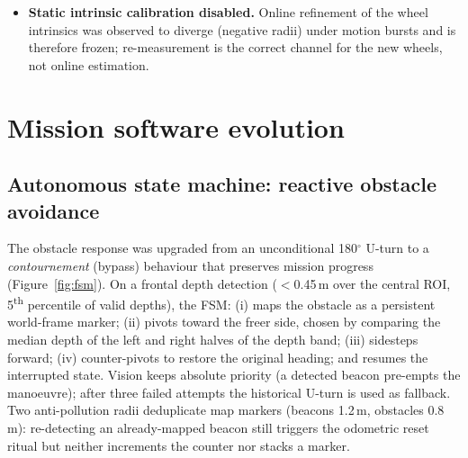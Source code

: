 \begin{itemize}
        modes. The correction is applied at the single command egress point
        (: a named  constant), so
        every drive path (manual, patrol, approach, pivot, return-to-base)
        inherits it consistently. A heading-projected odometry test
        ($-0.186$\,m reported along the firmware heading for a $+0.18$\,m
        commanded forward pulse) further indicates the firmware's body-frame
        \emph{forward} is now rotated 180$^\circ$ from the camera axis;
        after physical confirmation (the rover moves camera-forward on a
        positive command), both frame-level compensations were applied and
        validated: the mission backend rotates the firmware heading by
        $\pi$ at its single odometry ingress (map, return-to-base and world
        bearings all reason in the camera frame), and MINS's wheel extrinsic
        seed was set to $R_z(\pi)$, reconciling the wheel model with the
        inertial/camera frame. Post-fix validation: a forward pulse reads
        $+0.200$\,m along the camera heading (expected $+0.18$), and MINS
        accepts 100\% of wheel measurements ($\chi^2$ gate, residuals
        $\sim5\times10^{-6}$): ending a period during which the flipped
        frame caused silent wheel rejection and the loss of planar anchoring.
  \item \textbf{Static intrinsic calibration disabled.} Online refinement of
        the wheel intrinsics was observed to diverge (negative radii) under
        motion bursts and is therefore frozen; re-measurement is the correct
        channel for the new wheels, not online estimation.
\end{itemize}

\section{Mission software evolution}
\label{sec:missionsw}

\subsection{Autonomous state machine: reactive obstacle avoidance}
The obstacle response was upgraded from an unconditional 180$^\circ$ U-turn
to a \emph{contournement} (bypass) behaviour that preserves mission
progress (Figure~\ref{fig:fsm}). On a frontal depth detection
($<$0.45\,m over the central ROI, 5\textsuperscript{th} percentile of valid
depths), the FSM: (i) maps the obstacle as a persistent world-frame marker;
(ii) pivots toward the freer side, chosen by comparing the median depth of
the left and right halves of the depth band; (iii) sidesteps forward;
(iv) counter-pivots to restore the original heading; and resumes the
interrupted state. Vision keeps absolute priority (a detected beacon
pre-empts the manoeuvre); after three failed attempts the historical U-turn
is used as fallback. Two anti-pollution radii deduplicate map markers
(beacons 1.2\,m, obstacles 0.8\,m): re-detecting an already-mapped beacon
still triggers the odometric reset ritual but neither increments the counter
nor stacks a marker.

